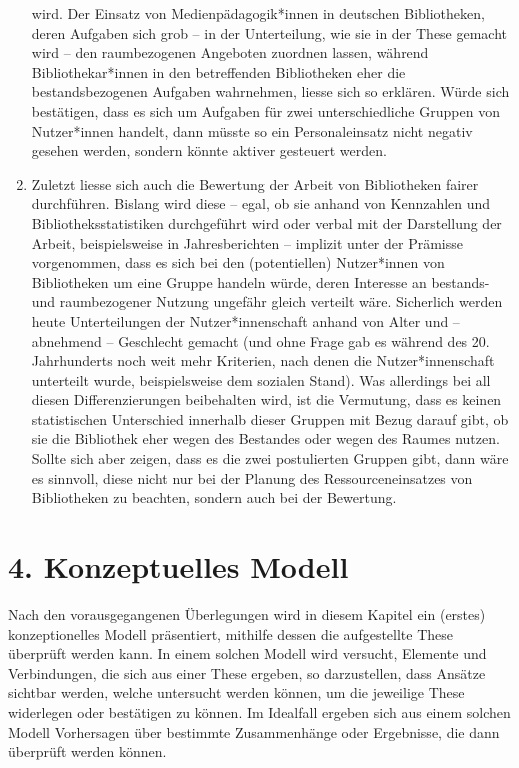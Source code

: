 \documentclass[a4paper,
fontsize=11pt,
oneside,
numbers=noperiodatend,
parskip=half-,
bibliography=totoc,
final
]{scrartcl}
\begin{document}
\begin{enumerate}
  wird. Der Einsatz von Medienpädagogik*innen in deutschen Bibliotheken,
  deren Aufgaben sich grob -- in der Unterteilung, wie sie in der These
  gemacht wird -- den raumbezogenen Angeboten zuordnen lassen, während
  Bibliothekar*innen in den betreffenden Bibliotheken eher die
  bestandsbezogenen Aufgaben wahrnehmen, liesse sich so erklären. Würde
  sich bestätigen, dass es sich um Aufgaben für zwei unterschiedliche
  Gruppen von Nutzer*innen handelt, dann müsste so ein Personaleinsatz
  nicht negativ gesehen werden, sondern könnte aktiver gesteuert werden.
\item
  Zuletzt liesse sich auch die Bewertung der Arbeit von Bibliotheken
  fairer durchführen. Bislang wird diese -- egal, ob sie anhand von
  Kennzahlen und Bibliotheksstatistiken durchgeführt wird oder verbal
  mit der Darstellung der Arbeit, beispielsweise in Jahresberichten --
  implizit unter der Prämisse vorgenommen, dass es sich bei den
  (potentiellen) Nutzer*innen von Bibliotheken um eine Gruppe handeln
  würde, deren Interesse an bestands- und raumbezogener Nutzung ungefähr
  gleich verteilt wäre. Sicherlich werden heute Unterteilungen der
  Nutzer*innenschaft anhand von Alter und -- abnehmend -- Geschlecht
  gemacht (und ohne Frage gab es während des 20. Jahrhunderts noch weit
  mehr Kriterien, nach denen die Nutzer*innenschaft unterteilt wurde,
  beispielsweise dem sozialen Stand). Was allerdings bei all diesen
  Differenzierungen beibehalten wird, ist die Vermutung, dass es keinen
  statistischen Unterschied innerhalb dieser Gruppen mit Bezug darauf
  gibt, ob sie die Bibliothek eher wegen des Bestandes oder wegen des
  Raumes nutzen. Sollte sich aber zeigen, dass es die zwei postulierten
  Gruppen gibt, dann wäre es sinnvoll, diese nicht nur bei der Planung
  des Ressourceneinsatzes von Bibliotheken zu beachten, sondern auch bei
  der Bewertung.
\end{enumerate}

\hypertarget{konzeptuelles-modell}{%
\section{4. Konzeptuelles Modell}\label{konzeptuelles-modell}}

Nach den vorausgegangenen Überlegungen wird in diesem Kapitel ein
(erstes) konzeptionelles Modell präsentiert, mithilfe dessen die
aufgestellte These überprüft werden kann. In einem solchen Modell wird
versucht, Elemente und Verbindungen, die sich aus einer These ergeben,
so darzustellen, dass Ansätze sichtbar werden, welche untersucht werden
können, um die jeweilige These widerlegen oder bestätigen zu können. Im
Idealfall ergeben sich aus einem solchen Modell Vorhersagen über
bestimmte Zusammenhänge oder Ergebnisse, die dann überprüft werden
können.
\end{document}
